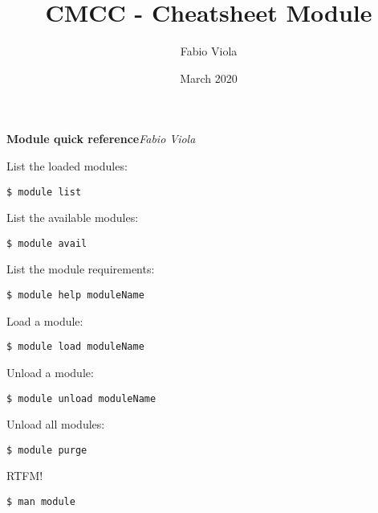\documentclass[twocolumn,8pt]{article}
\title{CMCC - Cheatsheet Module}
\author{Fabio Viola}
\date{March 2020}
\begin{document}

\LARGE \textbf{Module quick reference}\hfill \textit{\small Fabio Viola}\normalsize 

\begin{mdframed}[frametitle=Main commands]

List the loaded modules:
\begin{lstlisting}
$ module list
\end{lstlisting}

List the available modules:
\begin{lstlisting}
$ module avail
\end{lstlisting}

List the module requirements:
\begin{lstlisting}
$ module help moduleName
\end{lstlisting}

Load a module:
\begin{lstlisting}[deletekeywords={help},]
$ module load moduleName
\end{lstlisting}

Unload a module:
\begin{lstlisting}
$ module unload moduleName
\end{lstlisting}

Unload all modules:
\begin{lstlisting}
$ module purge
\end{lstlisting}

\end{mdframed}



\begin{mdframed}[frametitle=Resources]
RTFM!
\begin{lstlisting}
$ man module
\end{lstlisting}
\end{mdframed}    
\end{document}
